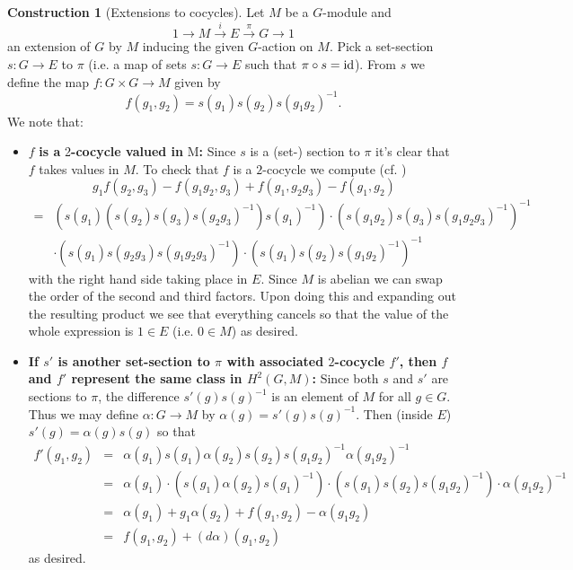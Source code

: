 \documentclass[11pt]{amsart}
\numberwithin{equation}{section}
\theoremstyle{remark}
\theoremstyle{remark}
\theoremstyle{remark}
\theoremstyle{definition}
\theoremstyle{definition}
\newtheorem{construction}[equation]{Construction}
\theoremstyle{definition}
\theoremstyle{definition}
\theoremstyle{definition}
\theoremstyle{definition}
\begin{document}
\begin{construction}[Extensions to cocycles] \label{Extensions to cocycles}
Let $M$ be a $G$-module and \[1\longrightarrow M \stackrel{i}{\longrightarrow}E \stackrel{\pi}{\longrightarrow}G\longrightarrow 1\]
an extension of $G$ by $M$ inducing the given $G$-action on $M$. Pick a set-section $s:G\rightarrow E$ to $\pi$ (i.e. a map of sets $s:G\rightarrow E$ such that $\pi \circ s=\textup{id}$). From $s$ we define the map $f:G\times G\rightarrow M$ given by
\[f(g_1,g_2)= s(g_1)s(g_2)s(g_1g_2)^{-1}.\]
We note that:
\begin{itemize}
\item $f$ \textbf{is a }2\textbf{-cocycle valued in }M\textbf{:} Since $s$ is a (set-) section to $\pi$ it's clear that $f$ takes values in $M$. To check that $f$ is a $2$-cocycle we compute (cf. ) 
\[g_1f(g_2,g_3)-f(g_1g_2,g_3)+f(g_1,g_2g_3)-f(g_1,g_2)\]
\begin{eqnarray*}=&\left(s(g_1)\left(s(g_2)s(g_3)s(g_2g_3)^{-1}\right)s(g_1)^{-1}\right)\cdot \left(s(g_1g_2)s(g_3)s(g_1g_2g_3)^{-1}\right)^{-1}\\&\cdot \left(s(g_1)s(g_2g_3)s(g_1g_2g_3)^{-1}\right)\cdot \left(s(g_1)s(g_2)s(g_1g_2)^{-1}\right)^{-1}\end{eqnarray*}
with the right hand side taking place in $E$. Since $M$ is abelian we can swap the order of the second and third factors. Upon doing this and expanding out the resulting product we see that everything cancels so that the value of the whole expression is $1\in E$ (i.e. $0\in M$) as desired.  
\item \textbf{If $s'$ is another set-section to $\pi$ with associated $2$-cocycle $f'$, then $f$ and $f'$ represent the same class in $H^2(G,M)$:} Since both $s$ and $s'$ are sections to $\pi$, the difference $s'(g)s(g)^{-1}$ is an element of $M$ for all $g\in G$. Thus we may define $\alpha:G\rightarrow M$ by $\alpha(g)=s'(g)s(g)^{-1}$. Then (inside $E$) $s'(g)=\alpha(g)s(g)$ so that 
\begin{eqnarray*}f'(g_1,g_2)&=&\alpha(g_1)s(g_1)\alpha(g_2)s(g_2)s(g_1g_2)^{-1}\alpha(g_1g_2)^{-1}\\
&=&\alpha(g_1)\cdot \left(s(g_1)\alpha(g_2)s(g_1)^{-1}\right)\cdot \left(s(g_1)s(g_2)s(g_1g_2)^{-1}\right)\cdot \alpha(g_1g_2)^{-1}\\
&=&\alpha(g_1)+g_1\alpha(g_2)+f(g_1,g_2)-\alpha(g_1g_2)\\
&=&f(g_1,g_2)+(d\alpha)(g_1,g_2)\end{eqnarray*}
as desired.
\end{itemize}
\end{construction}
\end{document}
